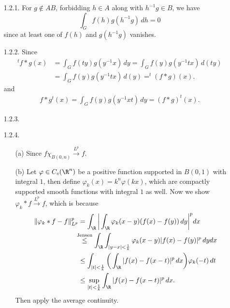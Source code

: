 \begin{enumerate}
\item[1.2.1.]
    For $g \notin AB$, forbidding $h\in A$ along with $h^{-1}g\in B$, we have
   \[\int_{G}f(h)g(h^{-1}g)\,dh =0\]
   since at least one of $f(h)$ and $g(h^{-1}g)$ vanishes.

\item[1.2.2.] 
   Since 
   \begin{equation*}\begin{aligned}
   ^{t}f * g(x) &= \int_{G}f(ty)g(y^{-1}x)\,dy = \int_{G}f(y)g(y^{-1}tx)\,d(ty)\\ 
   &= \int_{G}f(y)g(y^{-1}tx)\,d(y) = ^{t}(f * g)(x).
   \end{aligned}\end{equation*}
   and
   \begin{equation*}\begin{aligned}
   f * g^{t}(x) = \int_{G}f(y)g(y^{-1}xt)\,dy = (f * g)^{t}(x).
   \end{aligned}\end{equation*}

\item[1.2.3.]

\item[1.2.4.]
   \begin{enumerate}
   \item[(a)] Since $f\chi_{B(0,n)} \overset{L^{p}}{\longrightarrow} f$.
   
   \item[(b)] Let $\varphi \in C_{c}(\R^{n})$ be a positive function supported 
   in $B(0,1)$ with integral $1$, then define $\varphi_{k}(x)=k^n\varphi(kx)$, 
   which are compactly supported smooth functions with integral $1$ as well. 
   Now we show $\varphi_{k}*f \overset{L^{p}}{\longrightarrow} f$, which is because
   \begin{equation*}\begin{aligned}
   \norm{\varphi_{k}*f-f}_{L^p}^{p} &= \int_{\R}\bigg|\int_{\R}\varphi_{k}(x-y)(f(x)-f(y))\,dy\bigg|^{p}dx
   \\&\!\!\!\overset{\text{Jensen}}{\leq} \int_{\R}\int_{|y-x|<\frac{1}{k}}\varphi_{k}(x-y)|f(x)-f(y)|^{p}\,dydx
   \\&\leq \int_{|t|<\frac{1}{k}}\bigg(\int_{\R}|f(x)-f(x-t)|^{p}\,dx\bigg)\varphi_{k}(-t)\,dt
   \\&\leq \sup_{|t|<\frac{1}{k}}\int_{\R}|f(x)-f(x-t)|^{p}\,dx.
   \end{aligned}\end{equation*}
   Then apply the average continuity.
   \end{enumerate}


\end{enumerate}
